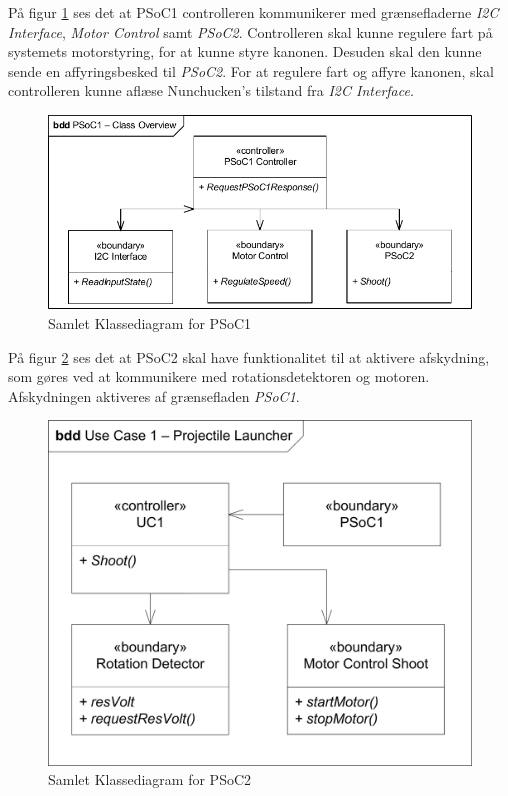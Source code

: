 På figur \ref{fig:CompleteClassDiagramPSoC1} ses det at PSoC1 controlleren kommunikerer med grænsefladerne \textit{I2C Interface}, \textit{Motor Control} samt \textit{PSoC2}. Controlleren skal kunne regulere fart på systemets motorstyring, for at kunne styre kanonen. Desuden skal den kunne sende en affyringsbesked til \textit{PSoC2}. For at regulere fart og affyre kanonen, skal controlleren kunne aflæse Nunchucken's tilstand fra \textit{I2C Interface}.
\begin{figure}[H]
	\centering
	\includegraphics[width=\textwidth] {Systemarkitektur/images/CompleteClassDiagramPSoC1}
	\caption{Samlet Klassediagram for PSoC1}
	\label{fig:CompleteClassDiagramPSoC1}
\end{figure}

På figur \ref{fig:CompleteClassDiagramPSoC2} ses det at PSoC2 skal have funktionalitet til at aktivere afskydning, som gøres ved at kommunikere med rotationsdetektoren og motoren. Afskydningen aktiveres af grænsefladen \textit{PSoC1}.
\begin{figure}[H]
	\centering
	\includegraphics[width=\textwidth] {Systemarkitektur/images/affyringKlassediagram.png}
	\caption{Samlet Klassediagram for PSoC2}
	\label{fig:CompleteClassDiagramPSoC2}
\end{figure}

